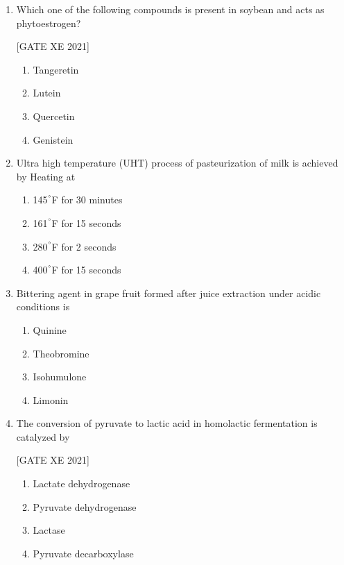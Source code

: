 \documentclass[journal,12pt,onecolumn]{IEEEtran}
\theoremstyle{remark}
\begin{document}
\begin{enumerate}[resume]
\item Which one of the following compounds is present in soybean and acts as phytoestrogen?

\hfill[GATE XE 2021]

\begin{multicols}{2}
\begin{enumerate}
\item Tangeretin
\item Lutein
\item Quercetin
\item Genistein
\end{enumerate}
\end{multicols}

 \item Ultra high temperature (UHT) process of pasteurization of milk is achieved by Heating at
\begin{multicols}{2}
\begin{enumerate}
    \item 145$^\degree$F for 30 minutes
    \item 161$^\degree$F for 15 seconds
    \item 280$^\degree$F for 2 seconds
    \item 400$^\degree$F for 15 seconds
\end{enumerate}
\end{multicols}

\item Bittering agent in grape fruit formed after juice extraction under acidic conditions is
\begin{multicols}{2}
\begin{enumerate}
    \item Quinine
    \item Theobromine
    \item Isohumulone
    \item Limonin
\end{enumerate}
\end{multicols}

\item The conversion of pyruvate to lactic acid in homolactic fermentation is catalyzed by

\hfill[GATE XE 2021]

\begin{multicols}{2}
\begin{enumerate}
\item Lactate dehydrogenase
\item Pyruvate dehydrogenase
\item Lactase
\item Pyruvate decarboxylase
\end{enumerate}
\end{multicols}



\end{enumerate}
\end{document}
